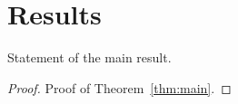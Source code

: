 \section{Results}
\label{sec:results}

\begin{theorem}
\label{thm:main}
Statement of the main result.
\end{theorem}

\begin{proof}
Proof of Theorem~\ref{thm:main}.
\end{proof}
